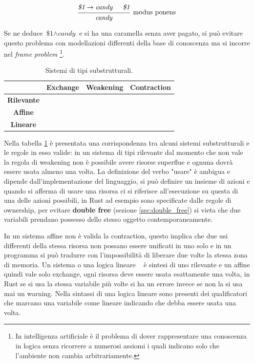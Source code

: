 \documentclass[Lau,binding=0.6cm]{sapthesis}
\newcommand{\cmark}{\ding{51}}
\newcommand{\xmark}{\ding{55}}
\begin{document}
\begin{equation*}
  \begin{prooftree}
    \hypo{\textit{\$1} \rightarrow \textit{candy}}
    \hypo{\textit{\$1}}
    \infer2[modus ponens]{\textit{candy}}
  \end{prooftree}
\end{equation*}

Se ne deduce $ \textit{\$1} \land \textit{candy} $ e si ha una caramella senza aver pagato, si può evitare questo problema con modellazioni differenti della base di conoscenza ma si incorre nel \textit{frame problem} \footnote{In intelligenza artificiale è il problema di dover rappresentare una conoscenza in logica senza ricorrere a numerosi assiomi i quali indicano solo che l'ambiente non cambia arbitrariamente.}. 

\begin{table}[h!t]
    \centering
    \caption{Sistemi di tipi substrutturali.}
    \label{tab:substructural_type_systems}
    \begin{tabular}{c|ccc}
        & \textbf{Exchange} & \textbf{Weakening} & \textbf{Contraction} \\
        \hline
        \textbf{Rilevante} & \cmark & \xmark & \cmark\\
        \textbf{Affine} & \cmark & \cmark & \xmark\\
        \textbf{Lineare} & \cmark & \xmark & \xmark\\
    \end{tabular}
\end{table}

Nella tabella \ref{tab:substructural_type_systems} è presentata una corrispondenza tra alcuni sistemi substrutturali e le regole in esso valide: in un sistema di tipi rilevante dal momento che non vale la regola di weakening non è possibile avere risorse superflue e ognuna dovrà essere usata almeno una volta. 
La definizione del verbo "usare" è ambigua e dipende dall'implementazione del linguaggio, si può definire un insieme di azioni e quando si afferma di usare una risorsa ci si riferisce all'esecuzione su questa di una delle azioni possibili, in Rust ad esempio sono specificate dalle regole di ownership, per evitare \textbf{double free} (sezione \ref{sec:double_free}) si vieta che due variabili prendano possesso dello stesso oggetto contemporaneamente.

In un sistema affine non è valida la contraction, questo implica che due usi differenti della stessa risorsa non possano essere unificati in uno solo e in un programma si può tradurre con l'impossibilità di liberare due volte la stessa zona di memoria.
Un sistema o una logica lineare ~\cite{girard:linear_logic} è sintesi di uno rilevante e un affine quindi vale solo exchange, ogni risorsa deve essere usata esattamente una volta, in Rust se si usa la stessa variabile più volte si ha un errore invece se non la si usa mai un warning.
Nella sintassi di una logica lineare sono presenti dei qualificatori che marcano una variabile come lineare indicando che debba essere usata una volta.
\end{document}
